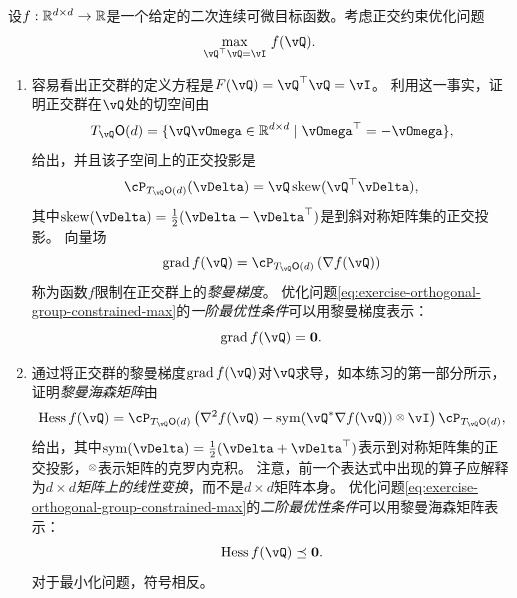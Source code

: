 \documentclass[../../book-main_zh.tex]{subfiles}
\begin{document}
设$f : \mathbb{R}^{d\times d} \to \mathbb{R}$是一个给定的二次连续可微目标函数。考虑正交约束优化问题
\begin{equation}\label{eq:exercise-orthogonal-group-constrained-max}
    \max_{\vQ^\top \vQ = \vI}\, f(\vQ). 
\end{equation}
\begin{enumerate}
    \item 容易看出正交群的定义方程是$F(\vQ) = \vQ^\top \vQ = \vI$。
    利用这一事实，证明正交群在$\vQ$处的切空间由
    \begin{equation*}
        T_{\vQ} \O(d) = \set{\vQ \vOmega \in \R^{d\times d} \given \vOmega^\top = - \vOmega},
    \end{equation*}
    给出，并且该子空间上的正交投影是
    \begin{equation*}
    \cP_{T_{\vQ}\O(d)}(\vDelta) =  \vQ \Skew(\vQ^\top \vDelta),
    \end{equation*}
    其中$\Skew(\vDelta) = \tfrac{1}{2} ( \vDelta - \vDelta^\top)$是到斜对称矩阵集的正交投影。
    向量场
    \begin{equation}\label{eq:exercise-riemann-grad-orthogonal-group}
    \mathrm{grad}\, f(\vQ) = \cP_{T_{\vQ} \O(d)} \left( \nabla f(\vQ) \right)
    \end{equation}
    称为函数$f$限制在正交群上的\textit{黎曼梯度}。
    优化问题\eqref{eq:exercise-orthogonal-group-constrained-max}的\textit{一阶最优性条件}可以用黎曼梯度表示：
    \begin{equation*}
        \mathrm{grad}\, f(\vQ) = \mathbf{0}.
    \end{equation*}
    \item 通过将正交群的黎曼梯度$\mathrm{grad}\, f(\vQ)$对$\vQ$求导，如本练习的第一部分所示，证明\textit{黎曼海森矩阵}由
    \begin{equation}\label{eq:exercise-riemann-hess-orthogonal-group}
        \mathrm{Hess}\, f(\vQ) = \cP_{T_{\vQ}\O(d)} \left( 
        \nabla^2 f(\vQ) - \Symm(\vQ\adj \nabla f(\vQ)) \kron \vI
        \right) \cP_{T_{\vQ}\O(d)},
    \end{equation}
    给出，其中$\Symm(\vDelta) = \tfrac{1}{2}(\vDelta + \vDelta^\top)$表示到对称矩阵集的正交投影，$\kron$表示矩阵的克罗内克积。
    注意，前一个表达式中出现的算子应解释为\textit{${d \times d}$矩阵上的线性变换}，而不是$d \times d$矩阵本身。
    优化问题\eqref{eq:exercise-orthogonal-group-constrained-max}的\textit{二阶最优性条件}可以用黎曼海森矩阵表示：
    \begin{equation*}
        \mathrm{Hess}\, f(\vQ) \preceq \mathbf{0}.
    \end{equation*}
    对于最小化问题，符号相反。
\end{enumerate}
\end{document}
